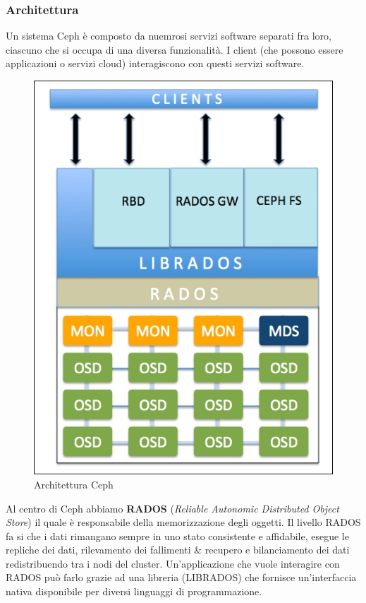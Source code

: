 \documentclass{article}
\begin{document}
\subsubsection{Architettura}
Un sistema Ceph è composto da nuemrosi servizi software separati fra loro, ciascuno che si occupa di una diversa funzionalità. I client (che possono essere applicazioni o servizi cloud) interagiscono con questi servizi software.
\begin{figure}[H]
    \centering
    \includegraphics[scale=0.3]{img/ceph.jpg}
    \caption{Architettura Ceph}
\end{figure}\noindent
Al centro di Ceph abbiamo \textbf{RADOS} (\textit{Reliable Autonomic Distributed Object Store}) il quale è responsabile della memorizzazione degli oggetti. Il livello RADOS fa si che i dati rimangano sempre in uno stato consistente e affidabile, esegue le repliche dei dati, rilevamento dei fallimenti \& recupero e bilanciamento dei dati redistribuendo tra i nodi del cluster. Un'applicazione che vuole interagire con RADOS può farlo grazie ad una libreria (LIBRADOS) che fornisce un'interfaccia nativa disponibile per diversi linguaggi di programmazione.\\
\end{document}
